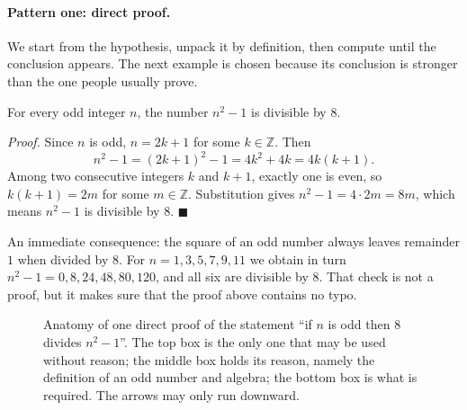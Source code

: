 \paragraph{Pattern one: direct proof.} We start from the hypothesis, unpack it
by definition, then compute until the conclusion appears. The next example is chosen
because its conclusion is stronger than the one people usually prove.

\begin{teorema}
For every odd integer $n$, the number $n^{2}-1$ is divisible by $8$.
\end{teorema}
\par\smallskip\noindent\textit{Proof.} Since $n$ is odd, $n = 2k+1$ for some
$k \in \mathbb{Z}$. Then
\[
  n^{2} - 1 = (2k+1)^{2} - 1 = 4k^{2} + 4k = 4k(k+1).
\]
Among two consecutive integers $k$ and $k+1$, exactly one is even,
so $k(k+1) = 2m$ for some $m \in \mathbb{Z}$. Substitution gives
$n^{2}-1 = 4 \cdot 2m = 8m$, which means $n^{2}-1$ is divisible by $8$.
\hfill$\blacksquare${\parfillskip=0pt\par}

An immediate consequence: the square of an odd number always leaves remainder $1$ when divided by $8$. For
$n = 1,3,5,7,9,11$ we obtain in turn $n^{2}-1 = 0, 8, 24, 48, 80, 120$, and
all six are divisible by $8$. That check is not a proof, but it makes sure that
the proof above contains no typo.

\begin{figure}[htbp]
\centering
{}
\caption{Anatomy of one direct proof of the statement ``if $n$ is odd then $8$ divides
$n^{2}-1$''. The top box is the only one that may be used without reason; the middle box holds
its reason, namely the definition of an odd number and algebra; the bottom box is what is required.
The arrows may only run downward.}
\label{fig:anatomi-bukti}
\end{figure}

